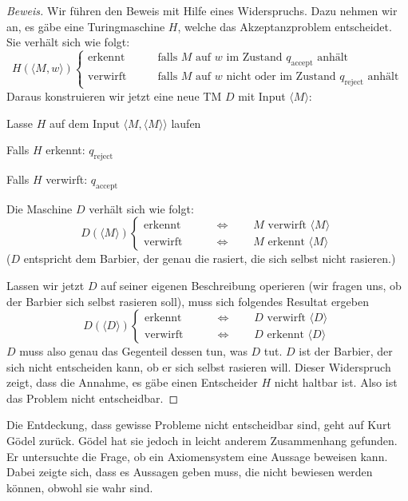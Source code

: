 \begin{proof}[Beweis]
Wir führen den Beweis mit Hilfe eines Widerspruchs.
Dazu nehmen wir
an, es gäbe eine Turingmaschine $H$, welche das Akzeptanzproblem entscheidet.
Sie verhält sich wie folgt:
\[
H(\langle M,w\rangle)\begin{cases}
\text{erkennt}&\qquad\text{falls $M$ auf $w$ im Zustand $q_{\text{accept}}$ anhält}
\\
\text{verwirft}&\qquad\text{falls $M$ auf $w$ nicht oder im Zustand $q_{\text{reject}}$ anhält}
\end{cases}
\]
Daraus konstruieren wir jetzt eine neue TM $D$ mit Input $\langle M\rangle$:
\medskip
\begin{compactenum}
\item Lasse $H$ auf dem Input $\langle M,\langle M\rangle\rangle$ laufen
\item Falls $H$ erkennt: $q_{\text{reject}}$
\item Falls $H$ verwirft: $q_{\text{accept}}$
\end{compactenum}
\medskip
Die Maschine $D$ verhält sich wie folgt:
\[
D(\langle M\rangle)\begin{cases}
\text{erkennt}&\qquad\Leftrightarrow\qquad \text{$M$ verwirft $\langle M\rangle$}
\\
\text{verwirft}&\qquad\Leftrightarrow\qquad \text{$M$ erkennt $\langle M\rangle$}
\end{cases}
\]
($D$ entspricht dem Barbier, der genau die rasiert, die sich selbst
nicht rasieren.)

Lassen wir jetzt $D$ auf seiner eigenen Beschreibung operieren
(wir fragen uns, ob der Barbier sich selbst rasieren soll), muss
sich folgendes Resultat ergeben
\[
D(\langle D\rangle)\begin{cases}
\text{erkennt}&\qquad\Leftrightarrow\qquad \text{$D$ verwirft $\langle D\rangle$}
\\
\text{verwirft}&\qquad\Leftrightarrow\qquad \text{$D$ erkennt $\langle D\rangle$}
\end{cases}
\]
$D$ muss also genau das Gegenteil dessen tun, was $D$ tut.
$D$ ist der Barbier, der sich nicht entscheiden kann, ob er sich selbst
rasieren will.
Dieser
Widerspruch zeigt, dass die Annahme, es gäbe einen Entscheider $H$
nicht haltbar ist.
Also ist das Problem nicht entscheidbar.
\end{proof}

%
Die Entdeckung, dass gewisse Probleme nicht entscheidbar sind,
geht auf Kurt Gödel zurück.
Gödel hat sie jedoch in leicht anderem Zusammenhang gefunden.
Er untersuchte die Frage, ob ein
Axiomensystem eine Aussage beweisen kann.
Dabei zeigte sich,
dass es Aussagen geben muss, die nicht bewiesen werden können,
obwohl sie wahr sind.

